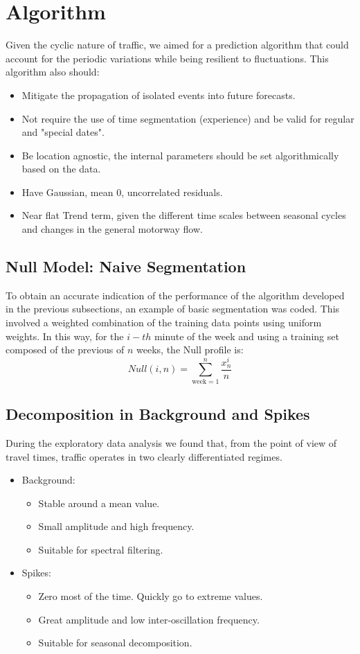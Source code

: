 \documentclass[conference]{IEEEtran}
\begin{document}
\section{Algorithm} \label{algorithm}
Given the cyclic nature of traffic, we aimed for a prediction algorithm that could account for the periodic variations while being resilient to fluctuations. This algorithm also should:
\begin{itemize}
	\item Mitigate the propagation of isolated events into future forecasts.
	\item Not require the use of time segmentation (experience) and be valid for regular and "special dates".
	\item Be location agnostic, the internal parameters should be set algorithmically based on the data.
	\item Have Gaussian, mean 0, uncorrelated residuals.
	\item Near flat Trend term, given the different time scales between seasonal cycles and changes in the general motorway flow.
\end{itemize}

\subsection{Null Model: Naive Segmentation}
To obtain an accurate indication of the performance of the algorithm developed in the previous subsections, an example of basic segmentation was coded. This involved a weighted combination of the training data points using uniform weights. In this way, for the $i-th$ minute of the week and using a training set composed of the previous of $n$ weeks, the Null profile is:
\begin{equation}
Null(i,n) = \sum_{\textrm{week}=1}^{n} \frac{x^i_n}{n} 
\end{equation}

\subsection{Decomposition in Background and Spikes}
During the exploratory data analysis we found that, from the point of view of travel times, traffic operates in two clearly differentiated regimes. 
\begin{itemize}
	\item Background: 
	\begin{itemize}
		\item Stable around a mean value.
		\item Small amplitude and high frequency.
		\item Suitable for spectral filtering.
	\end{itemize}
	\item Spikes: 
	\begin{itemize}
		\item Zero most of the time. Quickly go to extreme values.
		\item Great amplitude and low inter-oscillation frequency.
		\item Suitable for seasonal decomposition.
	\end{itemize}
\end{itemize}
\end{document}
